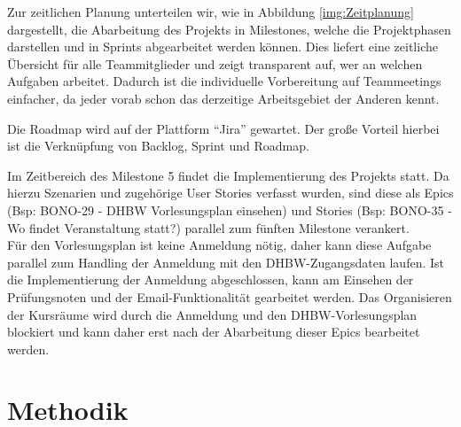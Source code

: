 \documentclass[a4paper,11pt]{scrartcl}
\begin{document}
Zur zeitlichen Planung unterteilen wir, wie in Abbildung \ref{img:Zeitplanung} dargestellt, die Abarbeitung des Projekts in Milestones, welche die Projektphasen darstellen und in Sprints abgearbeitet werden können. Dies liefert eine zeitliche Übersicht für alle Teammitglieder und zeigt transparent auf, wer an welchen Aufgaben arbeitet. Dadurch ist die individuelle Vorbereitung auf Teammeetings einfacher, da jeder vorab schon das derzeitige Arbeitsgebiet der Anderen kennt.

Die Roadmap wird auf der Plattform "`Jira"' gewartet. Der große Vorteil hierbei ist die Verknüpfung von Backlog, Sprint und Roadmap.

Im Zeitbereich des Milestone 5 findet die Implementierung des Projekts statt. Da hierzu Szenarien und zugehörige User Stories verfasst wurden, sind diese als Epics (Bsp: BONO-29 - DHBW Vorlesungsplan einsehen) und Stories (Bsp: BONO-35 - Wo findet Veranstaltung statt?) parallel zum fünften Milestone verankert.\\ 
Für den Vorlesungsplan ist keine Anmeldung nötig, daher kann diese Aufgabe parallel zum Handling der Anmeldung mit den DHBW-Zugangsdaten laufen. Ist die Implementierung der Anmeldung abgeschlossen, kann am Einsehen der Prüfungsnoten und der Email-Funktionalität gearbeitet werden.
Das Organisieren der Kursräume wird durch die Anmeldung und den DHBW-Vorlesungsplan blockiert und kann daher erst nach der Abarbeitung dieser Epics bearbeitet werden.
 



\section{Methodik}\label{sec:methodik}
\end{document}
